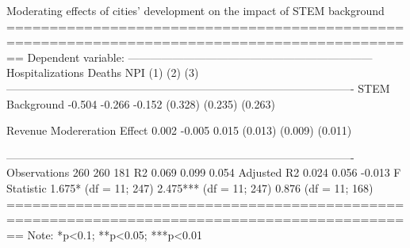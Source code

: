 
Moderating effects of cities’ development on the impact of STEM background
==============================================================================================
                                                   Dependent variable:                        
                            ------------------------------------------------------------------
                              Hospitalizations            Deaths                  NPI         
                                     (1)                    (2)                   (3)         
----------------------------------------------------------------------------------------------
STEM Background                    -0.504                 -0.266                 -0.152       
                                   (0.328)                (0.235)               (0.263)       
                                                                                              
Revenue Modereration Effect         0.002                 -0.005                 0.015        
                                   (0.013)                (0.009)               (0.011)       
                                                                                              
----------------------------------------------------------------------------------------------
Observations                         260                    260                   181         
R2                                  0.069                  0.099                 0.054        
Adjusted R2                         0.024                  0.056                 -0.013       
F Statistic                 1.675* (df = 11; 247) 2.475*** (df = 11; 247) 0.876 (df = 11; 168)
==============================================================================================
Note:                                                              *p<0.1; **p<0.05; ***p<0.01
